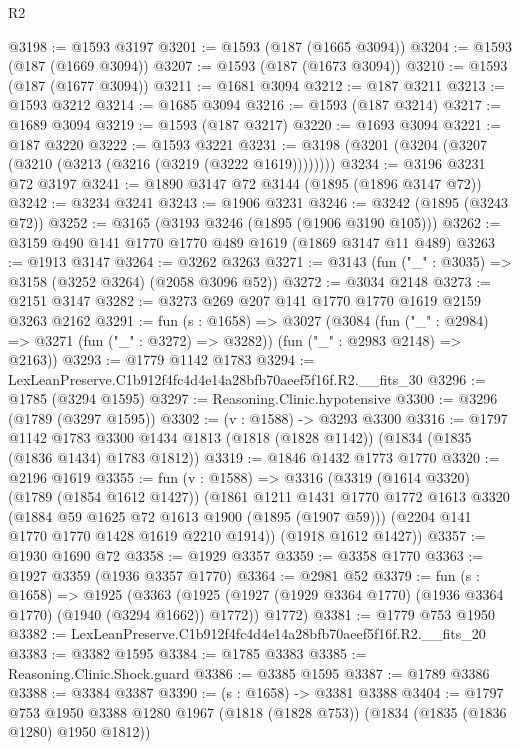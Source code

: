 \begin{lexlean}{R2}
\begin{coremodule}
@3198 := @1593 @3197
@3201 := @1593 (@187 (@1665 @3094))
@3204 := @1593 (@187 (@1669 @3094))
@3207 := @1593 (@187 (@1673 @3094))
@3210 := @1593 (@187 (@1677 @3094))
@3211 := @1681 @3094
@3212 := @187 @3211
@3213 := @1593 @3212
@3214 := @1685 @3094
@3216 := @1593 (@187 @3214)
@3217 := @1689 @3094
@3219 := @1593 (@187 @3217)
@3220 := @1693 @3094
@3221 := @187 @3220
@3222 := @1593 @3221
@3231 := @3198 (@3201 (@3204 (@3207 (@3210 (@3213 (@3216 (@3219 (@3222 @1619))))))))
@3234 := @3196 @3231 @72 @3197
@3241 := @1890 @3147 @72 @3144 (@1895 (@1896 @3147 @72))
@3242 := @3234 @3241
@3243 := @1906 @3231
@3246 := @3242 (@1895 (@3243 @72))
@3252 := @3165 (@3193 @3246 (@1895 (@1906 @3190 @105)))
@3262 := @3159 @490 @141 @1770 @1770 @489 @1619 (@1869 @3147 @11 @489)
@3263 := @1913 @3147
@3264 := @3262 @3263
@3271 := @3143 (fun ("_" : @3035) => @3158 (@3252 @3264) (@2058 @3096 @52))
@3272 := @3034 @2148
@3273 := @2151 @3147
@3282 := @3273 @269 @207 @141 @1770 @1770 @1619 @2159 @3263 @2162
@3291 := fun (s : @1658) =>
  @3027
    (@3084
      (fun ("_" : @2984) => @3271 (fun ("_" : @3272) => @3282))
      (fun ("_" : @2983 @2148) => @2163))
@3293 := @1779 @1142 @1783
@3294 := LexLeanPreserve.C1b912f4fc4d4e14a28bfb70aeef5f16f.R2.__fits_30
@3296 := @1785 (@3294 @1595)
@3297 := Reasoning.Clinic.hypotensive
@3300 := @3296 (@1789 (@3297 @1595))
@3302 := (v : @1588) -> @3293 @3300
@3316 := @1797
    @1142
    @1783
    @3300
    @1434
    @1813
    (@1818 (@1828 @1142))
    (@1834 (@1835 (@1836 @1434) @1783 @1812))
@3319 := @1846 @1432 @1773 @1770
@3320 := @2196 @1619
@3355 := fun (v : @1588) =>
  @3316
    (@3319
      (@1614 @3320)
      (@1789 (@1854 @1612 @1427))
      (@1861
        @1211
        @1431
        @1770
        @1772
        @1613
        @3320
        (@1884 @59 @1625 @72 @1613 @1900 (@1895 (@1907 @59)))
        (@2204 @141 @1770 @1770 @1428 @1619 @2210 @1914))
      (@1918 @1612 @1427))
@3357 := @1930 @1690 @72
@3358 := @1929 @3357
@3359 := @3358 @1770
@3363 := @1927 @3359 (@1936 @3357 @1770)
@3364 := @2981 @52
@3379 := fun (s : @1658) =>
  @1925
    (@3363
      (@1925 (@1927 (@1929 @3364 @1770) (@1936 @3364 @1770) (@1940 (@3294 @1662)) @1772))
      @1772)
@3381 := @1779 @753 @1950
@3382 := LexLeanPreserve.C1b912f4fc4d4e14a28bfb70aeef5f16f.R2.__fits_20
@3383 := @3382 @1595
@3384 := @1785 @3383
@3385 := Reasoning.Clinic.Shock.guard
@3386 := @3385 @1595
@3387 := @1789 @3386
@3388 := @3384 @3387
@3390 := (s : @1658) -> @3381 @3388
@3404 := @1797
    @753
    @1950
    @3388
    @1280
    @1967
    (@1818 (@1828 @753))
    (@1834 (@1835 (@1836 @1280) @1950 @1812))

\end{coremodule}
\end{lexlean}
